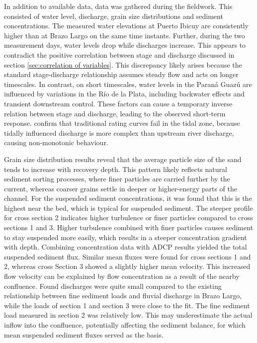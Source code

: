 In addition to available data, data was gathered during the fieldwork. This consisted of water level, discharge, grain size distributions and sediment concentrations. The measured water elevations at Puerto Ibicuy are consistently higher than at Brazo Largo on the same time instants. Further, during the two measurement days, water levels drop while discharges increase. This appears to contradict the positive correlation between stage and discharge discussed in section \ref{sec:correlation of variables}. This discrepancy likely arises because the standard stage-discharge relationship assumes steady flow and acts on longer timescales. In contrast, on short timescales, water levels in the Paraná Guazú are influenced by variations in the Río de la Plata, including backwater effects and transient downstream control. These factors can cause a temporary inverse relation between stage and discharge, leading to the observed short-term response. \textcite{jonesExpandedRatingCurve2019} confirm that traditional rating curves fail in the tidal zone, because tidally influenced discharge is more complex than upstream river discharge, causing non-monotonic behaviour. 

Grain size distribution results reveal that the average particle size of the sand tends to increase with recovery depth. This pattern likely reflects natural sediment sorting processes, where finer particles are carried further by the current, whereas coarser grains settle in deeper or higher-energy parts of the channel. For the suspended sediment concentrations, it was found that this is the highest near the bed, which is typical for suspended sediment. The steeper profile for cross section 2 indicates higher turbulence or finer particles compared to cross sections 1 and 3. Higher turbulence combined with finer particles causes sediment to stay suspended more easily, which results in a steeper concentration gradient with depth. Combining concentration data with ADCP results yielded the total suspended sediment flux. Similar mean fluxes were found for cross sections 1 and 2, whereas cross Section 3 showed a slightly higher mean velocity. This increased flow velocity can be explained by flow concentration as a result of the nearby confluence. Found discharges were quite small compared to the existing relationship between fine sediment loads and fluvial discharge in Brazo Largo, while the loads of section 1 and section 3 were close to the fit. The fine sediment load measured in section 2 was relatively low. This may underestimate the actual inflow into the confluence, potentially affecting the sediment balance, for which mean suspended sediment fluxes served as the basis.

